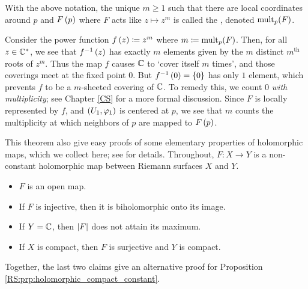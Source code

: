 \documentclass[../Moduli_Spaces_of_Riemann_Surfaces.tex]{subfiles}
\begin{document}
    \begin{definition}
        With the above notation, the unique $m\geq1$ such that there are local coordinates around $p$ and $F\left(p\right)$ where $F$ acts like $z\mapsto z^m$ is called the , denoted $\operatorname{mult}_p\!\left(F\right)$.
    \end{definition}
    \begin{remark}
        Consider the power function $f\left(z\right)\coloneqq z^m$ where $m\coloneqq\operatorname{mult}_p\!\left(F\right)$. Then, for all $z\in\mathbb{C}^*$, we see that $f^{-1}\left(z\right)$ has exactly $m$ elements given by the $m$ distinct $m^\textrm{th}$ roots of $z^m$. Thus the map $f$ causes $\mathbb{C}$ to `cover itself $m$ times', and those coverings meet at the fixed point $0$. But $f^{-1}\left(0\right)=\left\{0\right\}$ has only $1$ element, which prevents $f$ to be a $m$-sheeted covering of $\mathbb{C}$. To remedy this, we count $0$ \textit{with multiplicity}; see Chapter \ref{CS} for a more formal discussion. Since $F$ is locally represented by $f$, and $\left(U_1,\varphi_1\right)$ is centered at $p$, we see that $m$ counts the multiplicity at which neighbors of $p$ are mapped to $F\left(p\right)$.\exqed
    \end{remark}
    \begin{remark}
        This theorem also give easy proofs of some elementary properties of holomorphic maps, which we collect here; see \cite[][Section 1.2]{forster} for details. Throughout, $F:X\to Y$ is a non-constant holomorphic map between Riemann surfaces $X$ and $Y$.
        \begin{itemize}
            \item $F$ is an open map.
                \vspace{-0.05in}
            \item If $F$ is injective, then it is biholomorphic onto its image.
                \vspace{-0.05in}
            \item If $Y=\mathbb{C}$, then $\left|F\right|$ does not attain its maximum.
                \vspace{-0.05in}
            \item If $X$ is compact, then $F$ is surjective and $Y$ is compact.
        \end{itemize}
        Together, the last two claims give an alternative proof for Proposition \ref{RS:prp:holomorphic_compact_constant}.\exqed
    \end{remark}
\end{document}
